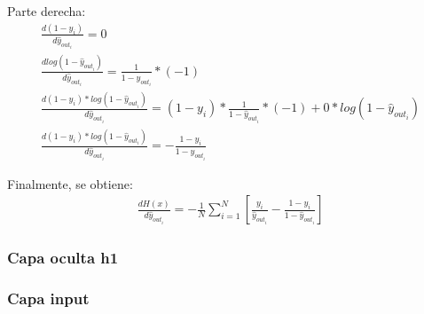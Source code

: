 Parte derecha:
\begin{gather}
	\frac{d(1-y_i)}{d\hat{y}_{out_i}} = 0\\
	\frac{dlog(1-\hat{y}_{out_i})}{d\hat{y}_{out_i}} = \frac{1}{1-\hat{y}_{out_i}} * (-1) \\
	\frac{d(1-y_i)*log(1-\hat{y}_{out_i})}{d\hat{y}_{out_i}} = (1-y_i)*\frac{1}{1-\hat{y}_{out_i}}*(-1) + 0* log(1-\hat{y}_{out_i}) \\
	\frac{d(1-y_i)*log(1-\hat{y}_{out_i})}{d\hat{y}_{out_i}} = -\frac{1-y_i}{1-\hat{y}_{out_i}}
\end{gather}

Finalmente, se obtiene: 
\begin{gather}
    \frac{dH(x)}{d\hat{y}_{out_i}} = - \frac{1}{N} \sum_{i=1}^{N}  [ \frac{y_i}{\hat{y}_{out_i}} - \frac{1-y_i}{1-\hat{y}_{out_i}} ]
\end{gather}

\subsubsection{Capa oculta h1}

\subsubsection{Capa input}